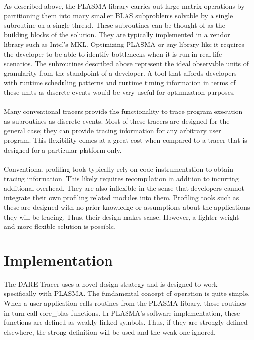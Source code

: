 \documentclass{article}
\begin{document}
\paragraph{}
As described above, the PLASMA library carries out large matrix operations by partitioning them into many smaller BLAS subproblems solvable by a single subroutine on a single thread. These subroutines can be thought of as the building blocks of the solution. They are typically implemented in a vendor library such as Intel's MKL. Optimizing PLASMA or any library like it requires the developer to be able to identify bottlenecks when it is run in real-life scenarios. The subroutines described above represent the ideal observable units of granularity from the standpoint of a developer. A tool that affords developers with runtime scheduling patterns and runtime timing information in terms of these units as discrete events would be very useful for optimization purposes.
\paragraph{}
Many conventional tracers provide the functionality to trace program execution as subroutines as discrete events. Most of these tracers are designed for the general case; they can provide tracing information for any arbitrary user program. This flexibility comes at a great cost when compared to a tracer that is designed for a particular platform only. 
\paragraph{}
Conventional profiling tools typically rely on code instrumentation to obtain tracing information. This likely requires recompilation in addition to incurring additional overhead. They are also inflexible in the sense that developers cannot integrate their own profiling related modules into them. Profiling tools such as these are designed with no prior knowledge or assumptions about the applications they will be tracing. Thus, their design makes sense. However, a lighter-weight and more flexible solution is possible.

\section{Implementation}
\paragraph{}
The DARE Tracer uses a novel design strategy and is designed to work specifically with PLASMA. The fundamental concept of operation is quite simple. When a user application calls routines from the PLASMA library, those routines in turn call core\_blas functions. In PLASMA's software implementation, these functions are defined as weakly linked symbols. Thus, if they are strongly defined elsewhere, the strong definition will be used and the weak one ignored.
\end{document}
